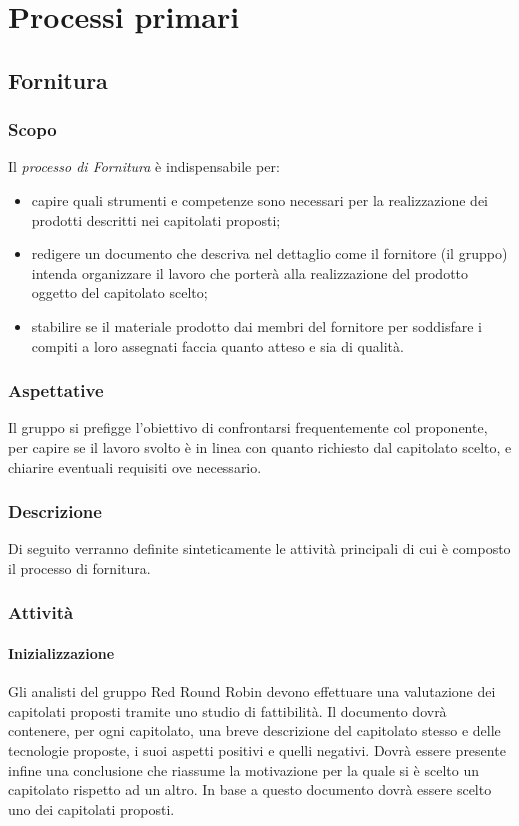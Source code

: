 \section{Processi primari} 


\subsection{Fornitura}

	\subsubsection{Scopo}
	\text Il \textit{processo di Fornitura} è indispensabile per:
	\begin{itemize}
	\item capire quali strumenti e competenze sono necessari per la realizzazione dei prodotti descritti nei capitolati proposti;
	\item redigere un documento che descriva nel dettaglio come il fornitore (il gruppo) intenda organizzare il lavoro che porterà alla realizzazione del prodotto oggetto del capitolato scelto;
	\item stabilire se il materiale prodotto dai membri del fornitore per soddisfare i compiti a loro assegnati faccia quanto atteso e sia di qualità.    
	\end{itemize}
 	\subsubsection{Aspettative}
	Il gruppo si prefigge l'obiettivo di confrontarsi frequentemente col proponente, per capire se il lavoro svolto è in linea con quanto richiesto dal capitolato scelto, e chiarire eventuali requisiti ove necessario.
	\subsubsection{Descrizione}
	Di seguito verranno definite sinteticamente le attività principali di cui è composto il processo di fornitura. 
	\subsubsection{Attività}
		
		\paragraph{Inizializzazione}
			Gli analisti del gruppo Red Round Robin devono effettuare una valutazione dei capitolati proposti tramite uno studio di fattibilità. 
			 Il documento dovrà contenere, per ogni capitolato, una breve descrizione del capitolato stesso e delle tecnologie proposte, i suoi aspetti positivi e quelli negativi. Dovrà essere presente infine una conclusione che riassume la motivazione per la quale si è scelto un capitolato rispetto ad un altro. 
			In base a questo documento dovrà essere scelto uno dei capitolati proposti.
